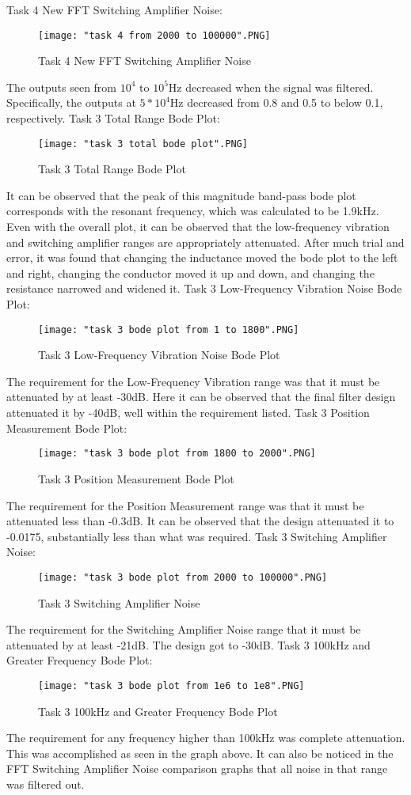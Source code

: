\documentclass[12pt]{article}
\begin{document}
  Task 4 New FFT Switching Amplifier Noise:
\begin{figure}[H]
\texttt{[image: "task 4 from 2000 to 100000".PNG]}
  \caption{Task 4 New FFT Switching Amplifier Noise}
  \end{figure}
The outputs seen from $10^4$ to $10^5$Hz decreased when the signal was filtered. Specifically, the outputs at $5*10^4$Hz decreased from 0.8 and 0.5 to below 0.1, respectively.
\clearpage  
Task 3 Total Range Bode Plot:
\begin{figure}[H]
\centering
\texttt{[image: "task 3 total bode plot".PNG]}
  \caption{Task 3 Total Range Bode Plot}
  \end{figure}
It can be observed that the peak of this magnitude band-pass bode plot corresponds with the resonant frequency, which was calculated to be 1.9kHz. Even with the overall plot, it can be observed that the low-frequency vibration and switching amplifier ranges are appropriately attenuated. After much trial and error, it was found that changing the inductance moved the bode plot to the left and right, changing the conductor moved it up and down, and changing the resistance narrowed and widened it.
  \clearpage
Task 3 Low-Frequency Vibration Noise Bode Plot: 
\begin{figure}[H]
\texttt{[image: "task 3 bode plot from 1 to 1800".PNG]}
  \caption{Task 3 Low-Frequency Vibration Noise Bode Plot}
  \end{figure}
The requirement for the Low-Frequency Vibration range was that it must be attenuated by at least -30dB. Here it can be observed that the final filter design attenuated it by -40dB, well within the requirement listed. 
\clearpage  
Task 3 Position Measurement Bode Plot:
\begin{figure}[H]
\texttt{[image: "task 3 bode plot from 1800 to 2000".PNG]}
  \caption{Task 3 Position Measurement Bode Plot}
  \end{figure}
The requirement for the Position Measurement range was that it must be attenuated less than -0.3dB. It can be observed that the design attenuated it to -0.0175, substantially less than what was required.
\clearpage  
Task 3 Switching Amplifier Noise:
\begin{figure}[H]
\texttt{[image: "task 3 bode plot from 2000 to 100000".PNG]}
  \caption{Task 3 Switching Amplifier Noise}
  \end{figure}
The requirement for the Switching Amplifier Noise range that it must be attenuated by at least -21dB. The design got to -30dB.
\clearpage  
Task 3 100kHz and Greater Frequency Bode Plot:
\begin{figure}[H]
\texttt{[image: "task 3 bode plot from 1e6 to 1e8".PNG]}
  \caption{Task 3 100kHz and Greater Frequency Bode Plot}
  \end{figure}
The requirement for any frequency higher than 100kHz was complete attenuation. This was accomplished as seen in the graph above. It can also be noticed in the FFT Switching Amplifier Noise comparison graphs that all noise in that range was filtered out.
\clearpage  
\end{document}
